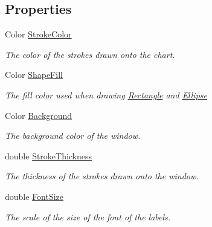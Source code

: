 \subsection*{Properties}
\begin{DoxyCompactItemize}
\item 
Color \mbox{\hyperlink{class_s_g_l_1_1_graph_af81e9aa32beac23df901a2483d0064d2}{Stroke\+Color}}
\begin{DoxyCompactList}\small\item\em The color of the strokes drawn onto the chart. \end{DoxyCompactList}\item 
Color \mbox{\hyperlink{class_s_g_l_1_1_graph_a14469c5ae5d52e1eec659f6800a36c37}{Shape\+Fill}}
\begin{DoxyCompactList}\small\item\em The fill color used when drawing \mbox{\hyperlink{class_s_g_l_1_1_rectangle}{Rectangle}} and \mbox{\hyperlink{class_s_g_l_1_1_ellipse}{Ellipse}} \end{DoxyCompactList}\item 
Color \mbox{\hyperlink{class_s_g_l_1_1_graph_a56d255eb64277564347b848684a8bb97}{Background}}
\begin{DoxyCompactList}\small\item\em The background color of the window. \end{DoxyCompactList}\item 
double \mbox{\hyperlink{class_s_g_l_1_1_graph_a40051c7b2a49c71f4dad7fef5b1e44ef}{Stroke\+Thickness}}
\begin{DoxyCompactList}\small\item\em The thickness of the strokes drawn onto the window. \end{DoxyCompactList}\item 
double \mbox{\hyperlink{class_s_g_l_1_1_graph_a466dbe496c87ac50283ee68af38ec98f}{Font\+Size}}
\begin{DoxyCompactList}\small\item\em The scale of the size of the font of the labels. \end{DoxyCompactList}\item 

\end{DoxyCompactItemize}
